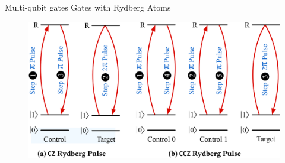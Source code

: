 \documentclass{beamer}
\begin{document}
\begin{frame}{Multi-qubit gates Gates with Rydberg Atoms}
    \begin{figure}
        \centering
        \includegraphics[width=0.8\linewidth]{images/multi-gate.png}
    \end{figure}
\end{frame}




\end{document}

